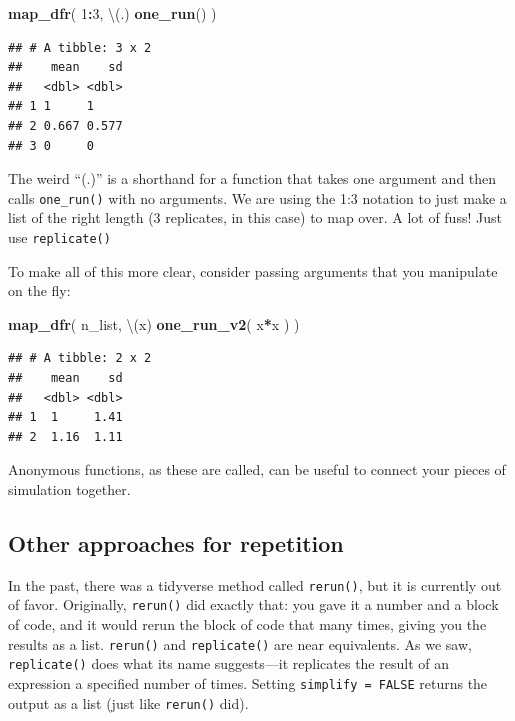 \documentclass[
]{book}
\newenvironment{Shaded}{\begin{snugshade}}{\end{snugshade}}
\newcommand{\DecValTok}[1]{\textcolor[rgb]{0.00,0.00,0.81}{#1}}
\newcommand{\FunctionTok}[1]{\textcolor[rgb]{0.13,0.29,0.53}{\textbf{#1}}}
\newcommand{\NormalTok}[1]{#1}
\newcommand{\SpecialCharTok}[1]{\textcolor[rgb]{0.81,0.36,0.00}{\textbf{#1}}}
\begin{document}
\begin{Shaded}
\begin{Highlighting}[]
\FunctionTok{map\_dfr}\NormalTok{( }\DecValTok{1}\SpecialCharTok{:}\DecValTok{3}\NormalTok{, \textbackslash{}(.) }\FunctionTok{one\_run}\NormalTok{() )}
\end{Highlighting}
\end{Shaded}

\begin{verbatim}
## # A tibble: 3 x 2
##    mean    sd
##   <dbl> <dbl>
## 1 1     1    
## 2 0.667 0.577
## 3 0     0
\end{verbatim}

The weird ``(.)'' is a shorthand for a function that takes one argument and then calls \texttt{one\_run()} with no arguments. We are using the 1:3 notation to just make a list of the right length (3 replicates, in this case) to map over. A lot of fuss! Just use \texttt{replicate()}

To make all of this more clear, consider passing arguments that you manipulate on the fly:

\begin{Shaded}
\begin{Highlighting}[]
\FunctionTok{map\_dfr}\NormalTok{( n\_list, \textbackslash{}(x) }\FunctionTok{one\_run\_v2}\NormalTok{( x}\SpecialCharTok{*}\NormalTok{x ) )}
\end{Highlighting}
\end{Shaded}

\begin{verbatim}
## # A tibble: 2 x 2
##    mean    sd
##   <dbl> <dbl>
## 1  1     1.41
## 2  1.16  1.11
\end{verbatim}

Anonymous functions, as these are called, can be useful to connect your pieces of simulation together.

\subsection{Other approaches for repetition}\label{other-approaches-for-repetition}

In the past, there was a tidyverse method called \texttt{rerun()}, but it is currently out of favor.
Originally, \texttt{rerun()} did exactly that: you gave it a number and a block of code, and it would rerun the block of code that many times, giving you the results as a list.
\texttt{rerun()} and \texttt{replicate()} are near equivalents.
As we saw, \texttt{replicate()} does what its name suggests---it replicates the result of an expression a specified number of times. Setting \texttt{simplify\ =\ FALSE} returns the output as a list (just like \texttt{rerun()} did).
\end{document}
